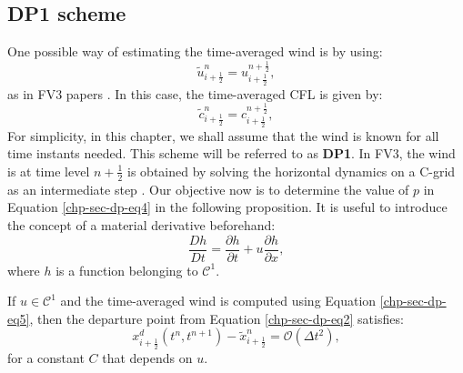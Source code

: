\subsection{DP1 scheme}
\label{chp-adv1d-sec-DP1}
One possible way of estimating the time-averaged wind is by using:
\begin{equation}
	\label{chp-sec-dp-eq5}
	\tilde{u}^n_{i+\frac{1}{2}} = u^{n+\frac{1}{2}}_{i+\frac{1}{2}},
\end{equation}
as in FV3 papers \citep{lin:1996,putman:2007}. 
In this case, the time-averaged CFL is given by:
\begin{equation}
	\label{chp-sec-dp-eq5b}
	\tilde{c}^n_{i+\frac{1}{2}} = c^{n+\frac{1}{2}}_{i+\frac{1}{2}},
\end{equation}
For simplicity, in this chapter, we shall assume that the wind is known for all time instants needed.
This scheme will be referred to as \textbf{DP1}.
In FV3, the wind is at time level $n+\frac{1}{2}$ is obtained by solving the horizontal dynamics on a C-grid as an intermediate step \citep{lin:1997,lin:2004}.
Our objective now is to determine the value of $p$ in Equation \eqref{chp-sec-dp-eq4}
in the following proposition. It is useful to introduce the concept of a material derivative beforehand:
\begin{equation*}
	\frac{Dh}{Dt} = \frac{\partial h}{\partial t} + u\frac{\partial h}{\partial x},
\end{equation*}
where $h$ is a function belonging to $\mathcal{C}^1$.
\begin{prop}
	\label{chp-sec-flux:dp_euler}
	If $u\in \mathcal{C}^1$ and the time-averaged wind is computed using Equation \eqref{chp-sec-dp-eq5}, then the departure point from Equation \eqref{chp-sec-dp-eq2} satisfies:
	\begin{equation}
         x_{i+\frac{1}{2}}^d(t^n,t^{n+1}) - \tilde{x}_{i+\frac{1}{2}}^n = \mathcal{O}(\Delta t^2),
	\end{equation}
	for a constant $C$ that depends on $u$.
\end{prop}
